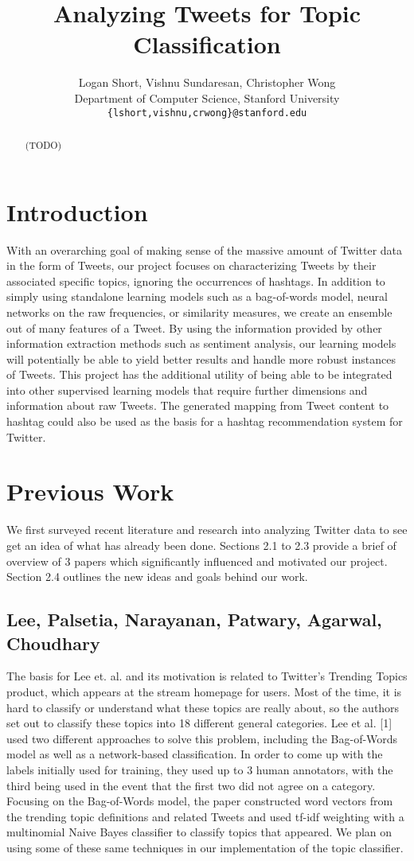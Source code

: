 \documentclass[11pt]{article}
\title{Analyzing Tweets for Topic Classification}
\author{Logan Short, Vishnu Sundaresan, Christopher Wong \\
  Department of Computer Science, Stanford University \\
  {\tt \{lshort,vishnu,crwong\}@stanford.edu}}
\date{}
\begin{document}
\maketitle
\begin{abstract}
(TODO)
\end{abstract}

\section{Introduction}

With an overarching goal of making sense of the massive amount of Twitter data in the form of Tweets, our project focuses on characterizing Tweets by their associated specific topics, ignoring the occurrences of hashtags. In addition to simply using standalone learning models such as a bag-of-words model, neural networks on the raw frequencies, or similarity measures, we create an ensemble out of many features of a Tweet. By using the information provided by other information extraction methods such as sentiment analysis, our learning models will potentially be able to yield better results and handle more robust instances of Tweets. This project has the additional utility of being able to be integrated into other supervised learning models that require further dimensions and information about raw Tweets. The generated mapping from Tweet content to hashtag could also be used as the basis for a hashtag recommendation system for Twitter.

\section{Previous Work}

We first surveyed recent literature and research into analyzing Twitter data to see get an idea of what has already been done. Sections 2.1 to 2.3 provide a brief of overview of 3 papers which significantly influenced and motivated our project. Section 2.4 outlines the new ideas and goals behind our work.

\subsection{Lee, Palsetia, Narayanan, Patwary, Agarwal, Choudhary}

The basis for Lee et. al. and its motivation is related to Twitter's Trending Topics product, which appears at the stream homepage for users. Most of the time, it is hard to classify or understand what these topics are really about, so the authors set out to classify these topics into 18 different general categories. Lee et al. [1] used two different approaches to solve this problem, including the Bag-of-Words model as well as a network-based classification. In order to come up with the labels initially used for training, they used up to 3 human annotators, with the third being used in the event that the first two did not agree on a category. Focusing on the Bag-of-Words model, the paper constructed word vectors from the trending topic definitions and related Tweets and used tf-idf weighting with a multinomial Naive Bayes classifier to classify topics that appeared. We plan on using some of these same techniques in our implementation of the topic classifier.
\end{document}
